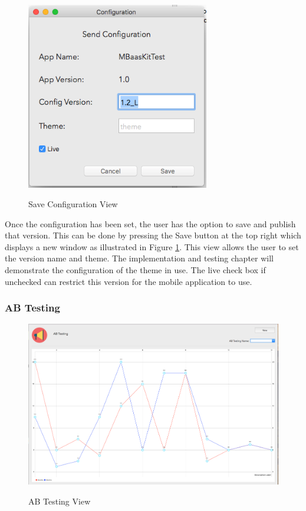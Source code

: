 \begin{figure}[!h]
    \caption{Save Configuration View}
    \centering
    \includegraphics[width=80mm]{images/dashboard/configuration}
    \label{fig:configuration}
\end{figure} 

Once the configuration has been set, the user has the option to save and publish that version. This can be done by pressing the Save button at the top right which displays a new window as illustrated in Figure \ref{fig:configuration}. This view allows the user to set the version name and theme. The implementation and testing chapter will demonstrate the configuration of the theme in use. The live check box if unchecked can restrict this version for the mobile application to use.

\subsubsection{AB Testing}

\begin{figure}[!h]
    \caption{AB Testing View}
    \centering
    \includegraphics[width=120mm]{images/dashboard/abtesting}
    \label{fig:abtesting-view}
\end{figure} 

